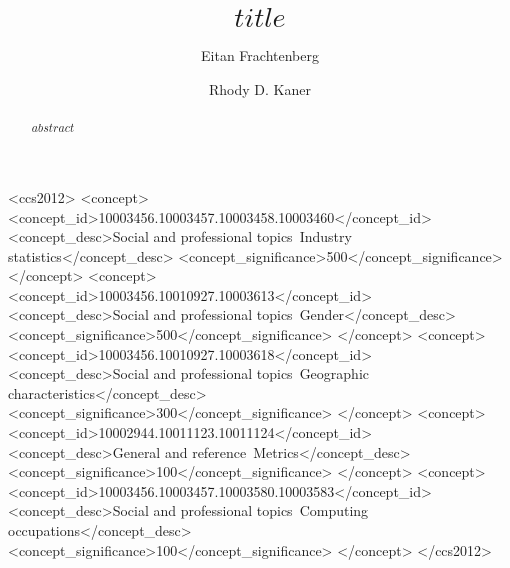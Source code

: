 \documentclass[sigconf, anonymous]{acmart}
\begin{document}
\title{$title$}

\author{Eitan Frachtenberg}

\author{Rhody D. Kaner}

\renewcommand{\shortauthors}{Frachtenberg and Kaner}

\begin{abstract}
  $abstract$
\end{abstract}


\begin{CCSXML}
<ccs2012>
<concept>
<concept_id>10003456.10003457.10003458.10003460</concept_id>
<concept_desc>Social and professional topics~Industry statistics</concept_desc>
<concept_significance>500</concept_significance>
</concept>
<concept>
<concept_id>10003456.10010927.10003613</concept_id>
<concept_desc>Social and professional topics~Gender</concept_desc>
<concept_significance>500</concept_significance>
</concept>
<concept>
<concept_id>10003456.10010927.10003618</concept_id>
<concept_desc>Social and professional topics~Geographic characteristics</concept_desc>
<concept_significance>300</concept_significance>
</concept>
<concept>
<concept_id>10002944.10011123.10011124</concept_id>
<concept_desc>General and reference~Metrics</concept_desc>
<concept_significance>100</concept_significance>
</concept>
<concept>
<concept_id>10003456.10003457.10003580.10003583</concept_id>
<concept_desc>Social and professional topics~Computing occupations</concept_desc>
<concept_significance>100</concept_significance>
</concept>
</ccs2012>
\end{CCSXML}



\end{document}
